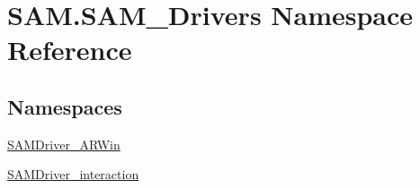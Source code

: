 \hypertarget{namespaceSAM_1_1SAM__Drivers}{}\section{S\+A\+M.\+S\+A\+M\+\_\+\+Drivers Namespace Reference}
\label{namespaceSAM_1_1SAM__Drivers}
\subsection*{Namespaces}
\begin{DoxyCompactItemize}
\item 
 \hyperlink{namespaceSAM_1_1SAM__Drivers_1_1SAMDriver__ARWin}{S\+A\+M\+Driver\+\_\+\+A\+R\+Win}
\item 
 \hyperlink{namespaceSAM_1_1SAM__Drivers_1_1SAMDriver__interaction}{S\+A\+M\+Driver\+\_\+interaction}
\end{DoxyCompactItemize}
